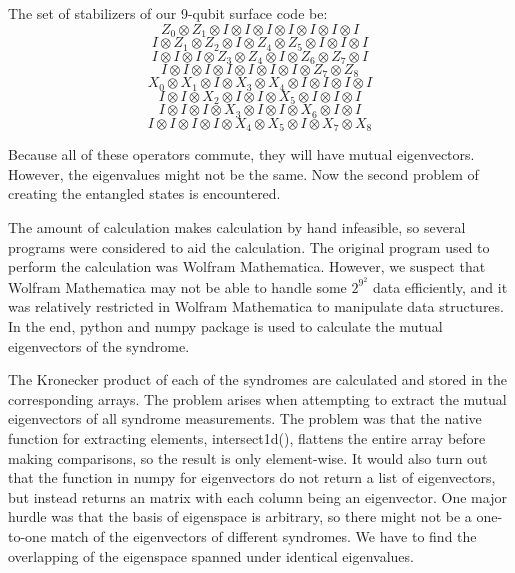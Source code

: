 \documentclass{article}
\begin{document}
The set of stabilizers of our 9-qubit surface code be:
\begin{equation}
    Z_0 \otimes Z_1 \otimes I \otimes I \otimes I \otimes I \otimes I \otimes I \otimes I
\end{equation}
\begin{equation}
    I \otimes Z_1 \otimes Z_2 \otimes I \otimes Z_4 \otimes Z_5 \otimes I \otimes I \otimes I
\end{equation}
\begin{equation}
    I \otimes I \otimes I \otimes Z_3 \otimes Z_4 \otimes I \otimes Z_6 \otimes Z_7 \otimes I
\end{equation}
\begin{equation}
    I \otimes I \otimes I \otimes I \otimes I \otimes I \otimes I \otimes Z_7 \otimes Z_8
\end{equation}
\begin{equation}
    X_0 \otimes X_1 \otimes I \otimes X_3 \otimes X_4 \otimes I \otimes I \otimes I \otimes I
\end{equation}
\begin{equation}
    I \otimes I \otimes X_2 \otimes I \otimes I \otimes X_5 \otimes I \otimes I \otimes I
\end{equation}
\begin{equation}
    I \otimes I \otimes I \otimes X_3 \otimes I \otimes I \otimes X_6 \otimes I \otimes I
\end{equation}
\begin{equation}
    I \otimes I \otimes I \otimes I \otimes X_4 \otimes X_5 \otimes I \otimes X_7 \otimes X_8
\end{equation}

Because all of these operators commute, they will have mutual eigenvectors. However, the eigenvalues might not be the same. Now the second problem of creating the entangled states is encountered.

The amount of calculation makes calculation by hand infeasible, so several programs were considered to aid the calculation. The original program used to perform the calculation was Wolfram Mathematica. However, we suspect that Wolfram Mathematica may not be able to handle some $2^{9^2}$ data efficiently, and it was relatively restricted in Wolfram Mathematica to manipulate data structures. In the end, python and numpy package is used to calculate the mutual eigenvectors of the syndrome.

The Kronecker product of each of the syndromes are calculated and stored in the corresponding arrays. The problem arises when attempting to extract the mutual eigenvectors of all syndrome measurements. The problem was that the native function for extracting elements, intersect1d(), flattens the entire array before making comparisons, so the result is only element-wise. It would also turn out that the function in numpy for eigenvectors do not return a list of eigenvectors, but instead returns an matrix with each column being an eigenvector. One major hurdle was that the basis of eigenspace is arbitrary, so there might not be a one-to-one match of the eigenvectors of different syndromes. We have to find the overlapping of the eigenspace spanned under identical eigenvalues.
\end{document}
